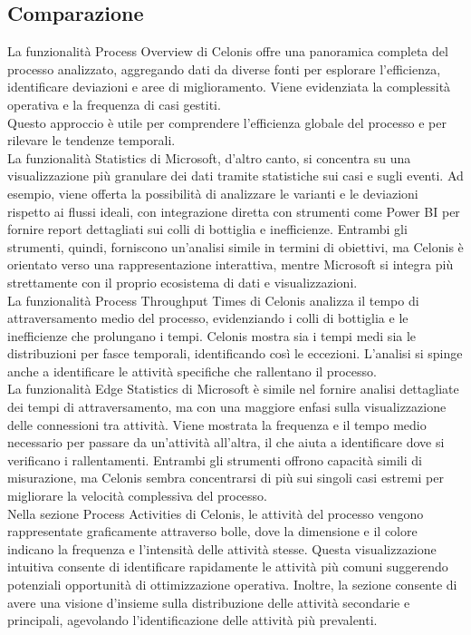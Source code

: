 \documentclass{article}
\begin{document}
\subsection{Comparazione}
La funzionalità Process Overview di Celonis offre una panoramica completa del processo analizzato, aggregando dati da diverse fonti per esplorare l'efficienza, identificare deviazioni e aree di miglioramento. Viene evidenziata la complessità operativa e la frequenza di casi gestiti.\\
Questo approccio è utile per comprendere l'efficienza globale del processo e per rilevare le tendenze temporali.\\
La funzionalità Statistics di Microsoft, d'altro canto, si concentra su una visualizzazione più granulare dei dati tramite statistiche sui casi e sugli eventi. Ad esempio, viene offerta la possibilità di analizzare le varianti e le deviazioni rispetto ai flussi ideali, con integrazione diretta con strumenti come Power BI per fornire report dettagliati sui colli di bottiglia e inefficienze. Entrambi gli strumenti, quindi, forniscono un’analisi simile in termini di obiettivi, ma Celonis è orientato verso una rappresentazione interattiva, mentre Microsoft si integra più strettamente con il proprio ecosistema di dati e visualizzazioni.\\
La funzionalità Process Throughput Times di Celonis analizza il tempo di attraversamento medio del processo, evidenziando i colli di bottiglia e le inefficienze che prolungano i tempi. Celonis mostra sia i tempi medi sia le distribuzioni per fasce temporali, identificando così le eccezioni. L’analisi si spinge anche a identificare le attività specifiche che rallentano il processo.\\
La funzionalità Edge Statistics di Microsoft è simile nel fornire analisi dettagliate dei tempi di attraversamento, ma con una maggiore enfasi sulla visualizzazione delle connessioni tra attività. Viene mostrata la frequenza e il tempo medio necessario per passare da un'attività all'altra, il che aiuta a identificare dove si verificano i rallentamenti. Entrambi gli strumenti offrono capacità simili di misurazione, ma Celonis sembra concentrarsi di più sui singoli casi estremi per migliorare la velocità complessiva del processo.\\
Nella sezione Process Activities di Celonis, le attività del processo vengono rappresentate graficamente attraverso bolle, dove la dimensione e il colore indicano la frequenza e l'intensità delle attività stesse. Questa visualizzazione intuitiva consente di identificare rapidamente le attività più comuni suggerendo potenziali opportunità di ottimizzazione operativa. Inoltre, la sezione consente di avere una visione d'insieme sulla distribuzione delle attività secondarie e principali, agevolando l'identificazione delle attività più prevalenti.\\
\end{document}
